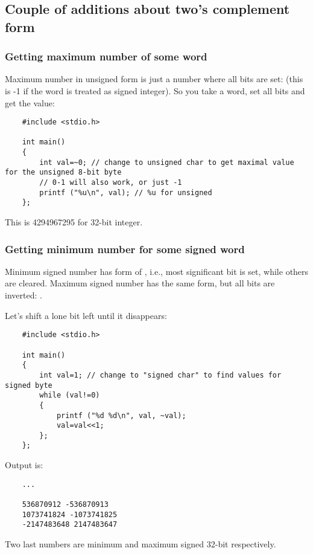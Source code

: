 \subsection{Couple of additions about two's complement form}

\subsubsection{Getting maximum number of some \gls{word}}

Maximum number in unsigned form is just a number where all bits are set: 
(this is -1 if the \gls{word} is treated as signed integer).
So you take a \gls{word}, set all bits and get the value:

\begin{lstlisting}
	#include <stdio.h>

	int main()
	{
		int val=~0; // change to unsigned char to get maximal value for the unsigned 8-bit byte
		// 0-1 will also work, or just -1
		printf ("%u\n", val); // %u for unsigned
	};
\end{lstlisting}

This is 4294967295 for 32-bit integer.

\subsubsection{Getting minimum number for some signed \gls{word}}

Minimum signed number has form of , i.e., most significant bit is set, while others are cleared.
Maximum signed number has the same form, but all bits are inverted: .

Let's shift a lone bit left until it disappears:

\begin{lstlisting}
	#include <stdio.h>

	int main()
	{
		int val=1; // change to "signed char" to find values for signed byte
		while (val!=0)
		{
			printf ("%d %d\n", val, ~val);
			val=val<<1;
		};
	};
\end{lstlisting}

Output is:

\begin{lstlisting}
	...

	536870912 -536870913
	1073741824 -1073741825
	-2147483648 2147483647
\end{lstlisting}

Two last numbers are minimum and maximum signed 32-bit  respectively.

